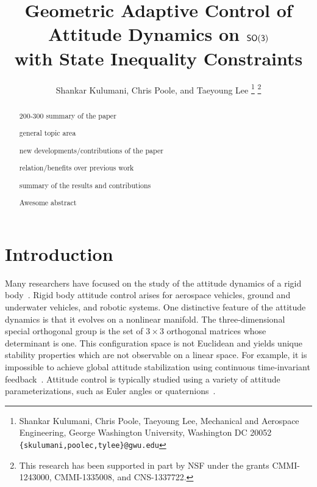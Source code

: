 \documentclass[letterpaper, 10 pt, conference]{ieeeconf}  %
\title{\LARGE \bf
Geometric Adaptive Control of Attitude Dynamics on $\mathsf{SO(3)}$\\ with State Inequality Constraints}
\author{Shankar Kulumani, Chris Poole, and Taeyoung Lee
\thanks{Shankar Kulumani, Chris Poole, Taeyoung Lee, Mechanical and Aerospace Engineering, George Washington University, Washington DC 20052 {\tt \{skulumani,poolec,tylee\}@gwu.edu}}
\thanks{This research has been supported in part by NSF under the grants CMMI-1243000, CMMI-1335008, and CNS-1337722.}
}
\begin{document}
\maketitle
\thispagestyle{empty}
\pagestyle{empty}


\begin{abstract}

200-300 summary of the paper

general topic area

new developments/contributions of the paper

relation/benefits over previous work

summary of the results and contributions

Awesome abstract

\end{abstract}


\section{Introduction}\label{sec:intro}
Many researchers have focused on the study of the attitude dynamics of a rigid body~\cite{hughes2004,wertz1978}.
Rigid body attitude control arises for aerospace vehicles, ground and underwater vehicles, and robotic systems.
One distinctive feature of the attitude dynamics is that it evolves on a nonlinear manifold.
The three-dimensional special orthogonal group is the set of \( 3 \times 3 \) orthogonal matrices whose determinant is one.
This configuration space is not Euclidean and yields unique stability properties which are not observable on a linear space.
For example, it is impossible to achieve global attitude stabilization using continuous time-invariant feedback~\cite{bhat2000}.
Attitude control is typically studied using a variety of attitude parameterizations, such as Euler angles or quaternions~\cite{shuster1993}.

\end{document}
